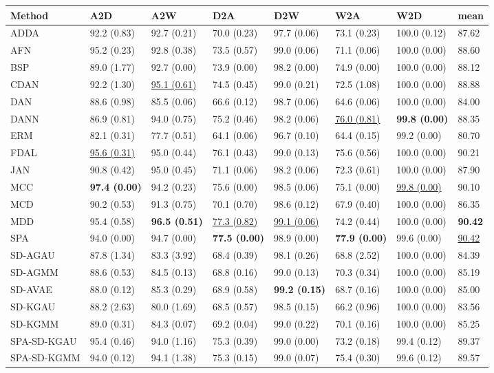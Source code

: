 \begin{tabular}{llllllll}
\toprule
Method & A2D & A2W & D2A & D2W & W2A & W2D & mean \\
\midrule
ADDA & 92.2 (0.83) & 92.7 (0.21) & 70.0 (0.23) & 97.7 (0.06) & 73.1 (0.23) & 100.0 (0.12) & 87.62 \\
AFN & 95.2 (0.23) & 92.8 (0.38) & 73.5 (0.57) & 99.0 (0.06) & 71.1 (0.06) & 100.0 (0.00) & 88.60 \\
BSP & 89.0 (1.77) & 92.7 (0.00) & 73.9 (0.00) & 98.2 (0.00) & 74.9 (0.00) & 100.0 (0.00) & 88.12 \\
CDAN & 92.2 (1.30) & \underline{95.1 (0.61)} & 74.5 (0.45) & 99.0 (0.21) & 72.5 (1.08) & 100.0 (0.00) & 88.88 \\
DAN & 88.6 (0.98) & 85.5 (0.06) & 66.6 (0.12) & 98.7 (0.06) & 64.6 (0.06) & 100.0 (0.00) & 84.00 \\
DANN & 86.9 (0.81) & 94.0 (0.75) & 75.2 (0.46) & 98.2 (0.06) & \underline{76.0 (0.81)} & \textbf{99.8 (0.00)} & 88.35 \\
ERM & 82.1 (0.31) & 77.7 (0.51) & 64.1 (0.06) & 96.7 (0.10) & 64.4 (0.15) & 99.2 (0.00) & 80.70 \\
FDAL & \underline{95.6 (0.31)} & 95.0 (0.44) & 76.1 (0.43) & 99.0 (0.13) & 75.6 (0.56) & 100.0 (0.00) & 90.21 \\
JAN & 90.8 (0.42) & 95.0 (0.45) & 71.1 (0.06) & 98.2 (0.06) & 72.3 (0.61) & 100.0 (0.00) & 87.90 \\
MCC & \textbf{97.4 (0.00)} & 94.2 (0.23) & 75.6 (0.00) & 98.5 (0.06) & 75.1 (0.00) & \underline{99.8 (0.00)} & 90.10 \\
MCD & 90.2 (0.53) & 91.3 (0.75) & 70.1 (0.70) & 98.6 (0.12) & 67.9 (0.40) & 100.0 (0.00) & 86.35 \\
MDD & 95.4 (0.58) & \textbf{96.5 (0.51)} & \underline{77.3 (0.82)} & \underline{99.1 (0.06)} & 74.2 (0.44) & 100.0 (0.00) & \textbf{90.42} \\
SPA & 94.0 (0.00) & 94.7 (0.00) & \textbf{77.5 (0.00)} & 98.9 (0.00) & \textbf{77.9 (0.00)} & 99.6 (0.00) & \underline{90.42} \\
\midrule
SD-AGAU & 87.8 (1.34) & 83.3 (3.92) & 68.4 (0.39) & 98.1 (0.26) & 68.8 (2.52) & 100.0 (0.00) & 84.39 \\
SD-AGMM & 88.6 (0.53) & 84.5 (0.13) & 68.8 (0.16) & 99.0 (0.13) & 70.3 (0.34) & 100.0 (0.00) & 85.19 \\
SD-AVAE & 88.0 (0.12) & 85.3 (0.29) & 68.9 (0.58) & \textbf{99.2 (0.15)} & 68.7 (0.16) & 100.0 (0.00) & 85.00 \\
SD-KGAU & 88.2 (2.63) & 80.0 (1.69) & 68.5 (0.57) & 98.5 (0.15) & 66.2 (0.96) & 100.0 (0.00) & 83.56 \\
SD-KGMM & 89.0 (0.31) & 84.3 (0.07) & 69.2 (0.04) & 99.0 (0.22) & 70.1 (0.16) & 100.0 (0.00) & 85.25 \\
SPA-SD-KGAU & 95.4 (0.46) & 94.0 (1.16) & 75.3 (0.39) & 99.0 (0.00) & 73.2 (0.18) & 99.4 (0.12) & 89.37 \\
SPA-SD-KGMM & 94.0 (0.12) & 94.1 (1.38) & 75.3 (0.15) & 99.0 (0.07) & 75.4 (0.30) & 99.6 (0.12) & 89.57 \\
\bottomrule
\end{tabular}
